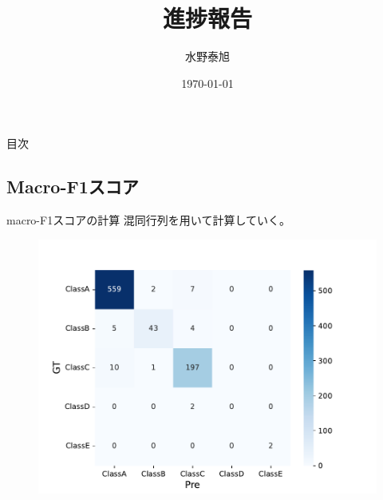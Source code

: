 \documentclass[leno,xcolor=dvipsnames]{beamer}
\title{進捗報告}
\date{\today}
\author{水野泰旭}
\institute{弘前大学理工学部電子情報工学科4年}
\begin{document}
  \maketitle

  \begin{frame}[plain]{目次}
    \tableofcontents
  \end{frame}

  \begin{frame}[plain]
    \section{Macro-F1スコア}
  \end{frame}

  \begin{frame}{macro-F1スコアの計算}
    混同行列を用いて計算していく。
    \begin{figure}[H]
      \centering  
      \includegraphics[keepaspectratio,scale=0.5]{images/deepimfam_confusion_matrix_cnt.pdf}
    \end{figure}
  \end{frame}
\end{document}
